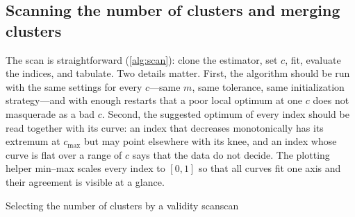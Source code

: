 \subsection{Scanning the number of clusters and merging clusters}\label{sec:val:scan}

The scan is straightforward (\cref{alg:scan}): clone the estimator, set $c$, fit, evaluate the indices, and tabulate. Two details matter. First, the algorithm should be run with the same settings for every $c$---same $m$, same tolerance, same initialization strategy---and with enough restarts that a poor local optimum at one $c$ does not masquerade as a bad $c$. Second, the suggested optimum of every index should be read together with its curve: an index that decreases monotonically has its extremum at $c_{\max}$ but may point elsewhere with its knee, and an index whose curve is flat over a range of $c$ says that the data do not decide. The plotting helper  min--max scales every index to $[0,1]$ so that all curves fit one axis and their agreement is visible at a glance.

\begin{algobox}{Selecting the number of clusters by a validity scan}{scan}
\begin{algorithm}[H]
\end{algorithm}
\end{algobox}

